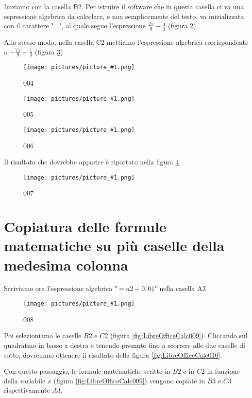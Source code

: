 \documentclass[17pt]{extarticle}
\newcommand{\pict}[1]{
\begin{figure}[h!]		
	\centering
   	\texttt{[image: pictures/picture\_\#1.png]}
  	\caption{#1}
   	\label{fig:LibreOfficeCalc#1}
\end{figure}
}
\begin{document}
 



Iniziamo con la casella B2. Per istruire il software che in questa casella ci va una espressione algebrica da calcolare, e non semplicemente del testo, va inizializzata con il carattere "=", al quale segue l'espressione $\frac{2x}{9} - \frac{4}{3}$ (figura \ref{fig:LibreOfficeCalc005}).


Allo stesso modo, nella casella C2 mettiamo l'espressione algebrica corrispondente a $-\frac{7x}{9} - \frac{1}{3}$ (figura \ref{fig:LibreOfficeCalc006})



\pict{004}



%
\pict{005}


%
\pict{006}


Il risultato che dovrebbe apparire è riportato nella figura \ref{fig:LibreOfficeCalc007}


%
\pict{007}


\newpage
\mbox{}
\newpage
\mbox{}
\newpage

\section{Copiatura delle formule matematiche su più caselle della medesima colonna}

Scriviamo ora l'espressione algebrica "$=a2 + 0,01$" nella casella A3

%
\pict{008}


Poi selezioniamo le caselle $B2$ e $C2$ (figura \ref{fig:LibreOfficeCalc009}). Cliccando sul quadratino in basso a destra e tenendo premuto fino a scorrere alle due caselle di sotto, dovremmo ottenere il risultato della figura \ref{fig:LibreOfficeCalc010}.

Con questo passaggio, le formule matematiche scritte in $B2$ e in $C2$ in funzione della variabile $x$ (figura \ref{fig:LibreOfficeCalc009}) vengono copiate in $B3$ e $C3$ rispettivamente $A3$.
\end{document}
